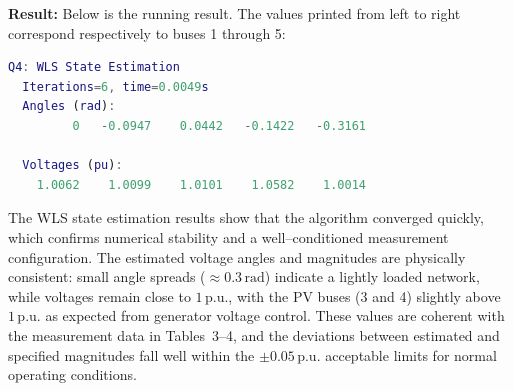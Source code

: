 \documentclass{article}
\begin{document}
\textbf{Result:} Below is the running result. The values printed from left to right correspond respectively to buses 1 through 5:
\begin{lstlisting}[language=Matlab]
Q4: WLS State Estimation
  Iterations=6, time=0.0049s
  Angles (rad):
         0   -0.0947    0.0442   -0.1422   -0.3161

  Voltages (pu):
    1.0062    1.0099    1.0101    1.0582    1.0014
\end{lstlisting}

The WLS state estimation results show that the algorithm converged quickly, which confirms numerical stability and a well--conditioned measurement configuration. The estimated voltage angles and magnitudes are physically consistent: small angle spreads ($\approx 0.3\,\mathrm{rad}$) indicate a lightly loaded network, while voltages remain close to $1\,\mathrm{p.u.}$, with the PV buses (3 and 4) slightly above $1\,\mathrm{p.u.}$ as expected from generator voltage control. These values are coherent with the measurement data in Tables~3--4, and the deviations between estimated and specified magnitudes fall well within the $\pm 0.05\,\mathrm{p.u.}$ acceptable limits for normal operating conditions. 
\end{document}
